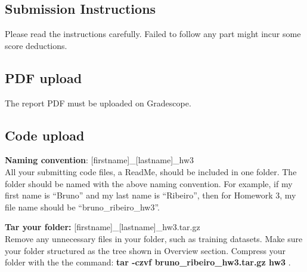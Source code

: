 \documentclass{article}
\newcommand{\homeworknumber}{3\xspace}
\begin{document}

\clearpage

%
\subsection*{Submission Instructions}
%
Please read the instructions carefully.
%
Failed to follow any part might incur some score deductions.

%
\hfill

%
\subsection*{\bf PDF upload}
%
The report PDF must be uploaded on Gradescope.

%
\hfill

%
\subsection*{\bf Code upload}
%
\noindent \textbf{Naming convention}:
%
[firstname]\_[lastname]\_hw\homeworknumber
\\
%
All your submitting code files, a ReadMe, should be included in one folder.
%
The folder should be named with the above naming convention.
%
For example, if my first name is ``Bruno'' and my last name is ``Ribeiro'',
then for Homework \homeworknumber, my file name should be
``bruno\_ribeiro\_hw\homeworknumber''.

%
\hfill

%
\noindent \textbf{Tar your folder:}
%
[firstname]\_[lastname]\_hw\homeworknumber.tar.gz
\\
%
Remove any unnecessary files in your folder, such as training datasets.
%
Make sure your folder structured as the tree shown in Overview section.
%
{\color{red} Compress your folder with the the command:
%
\textbf{
    tar -czvf bruno\_ribeiro\_hw\homeworknumber.tar.gz hw\homeworknumber
}.}
\end{document}
